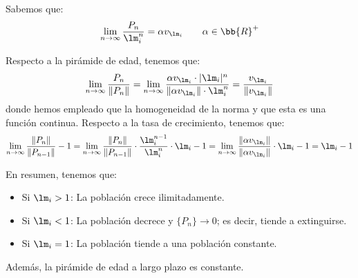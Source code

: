 Sabemos que:
\begin{equation*}
    \lim_{n\to \infty} \frac{P_n}{\lm_i^n} = \alpha v_{\lm_i} \qquad \alpha\in \bb{R}^+
\end{equation*}

Respecto a la pirámide de edad, tenemos que:
\begin{equation*}
    \lim_{n\to \infty} \frac{P_n}{\|P_n\|}
    = \lim_{n\to \infty} \frac{\alpha v_{\lm_i}\cdot |\lm_i|^n}{\|\alpha v_{\lm_i}\|\cdot \lm_i^n} = \frac{v_{\lm_i}}{\|v_{\lm_i}\|}
\end{equation*}
donde hemos empleado que la homogeneidad de la norma y que esta es una función continua.
Respecto a la tasa de crecimiento, tenemos que:
\begin{equation*}
    \lim_{n\to \infty} \frac{\|P_n\|}{\|P_{n-1}\|}-1
    = \lim_{n\to \infty} \frac{\|P_n\|}{\|P_{n-1}\|}\cdot \frac{\lm_i^{n-1}}{\lm_i^n}\cdot \lm_i-1
    = \lim_{n\to \infty} \frac{\|\alpha v_{\lm_i}\|}{\|\alpha v_{\lm_i}\|} \cdot \lm_i -1 = \lm_i-1
\end{equation*}

En resumen, tenemos que:
\begin{itemize}
    \item Si $\lm_i>1$: La población crece ilimitadamente.
    \item Si $\lm_i<1$: La población decrece y $\{P_n\}\to 0$; es decir, tiende a extinguirse.
    \item Si $\lm_i=1$: La población tiende a una población constante.
\end{itemize}
Además, la pirámide de edad a largo plazo es constante.\\

